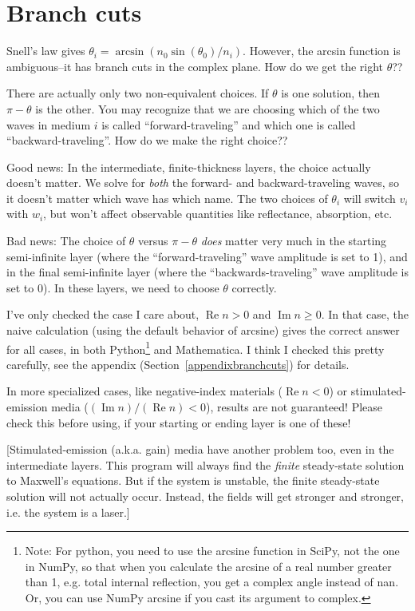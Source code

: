 \documentclass[12pt]{article}
\renewcommand{\(}{\left(}
\renewcommand{\)}{\right)}
\renewcommand{\Im}{\operatorname{Im}}
\renewcommand{\Re}{\operatorname{Re}}
\begin{document}
\section{Branch cuts \label{branchcuts}}

Snell's law gives $\theta_i = \arcsin(n_0 \sin(\theta_0)/n_i)$. However, the arcsin function is ambiguous--it has branch cuts in the complex plane. How do we get the right $\theta$??

There are actually only two non-equivalent choices. If $\theta$ is one solution, then $\pi-\theta$ is the other. You may recognize that we are choosing which of the two waves in medium $i$ is called ``forward-traveling'' and which one is called ``backward-traveling''. How do we make the right choice??

Good news: In the intermediate, finite-thickness layers, the choice actually doesn't matter. We solve for \emph{both} the forward- and backward-traveling waves, so it doesn't matter which wave has which name. The two choices of $\theta_i$ will switch $v_i$ with $w_i$, but won't affect observable quantities like reflectance, absorption, etc.

Bad news: The choice of $\theta$ versus $\pi-\theta$ \emph{does} matter very much in the starting semi-infinite layer (where the ``forward-traveling'' wave amplitude is set to 1), and in the final semi-infinite layer (where the ``backwards-traveling'' wave amplitude is set to 0). In these layers, we need to choose $\theta$ correctly.

I've only checked the case I care about, $\Re n>0$ and $\Im n \geq 0$. In that case, the naive calculation (using the default behavior of arcsine) gives the correct answer for all cases, in both Python\footnote{Note: For python, you need to use the arcsine function in SciPy, not the one in NumPy, so that when you calculate the arcsine of a real number greater than 1, e.g. total internal reflection, you get a complex angle instead of nan. Or, you can use NumPy arcsine if you cast its argument to complex.} and Mathematica. I think I checked this pretty carefully, see the appendix (Section~\ref{appendixbranchcuts}) for details.

In more specialized cases, like negative-index materials ($\Re n <0$) or stimulated-emission media ($(\Im n)/(\Re n)<0$), results are not guaranteed! Please check this before using, if your starting or ending layer is one of these!

[Stimulated-emission (a.k.a. gain) media have another problem too, even in the intermediate layers. This program will always find the \emph{finite} steady-state solution to Maxwell's equations. But if the system is unstable, the finite steady-state solution will not actually occur. Instead, the fields will get stronger and stronger, i.e. the system is a laser.]
\end{document}
